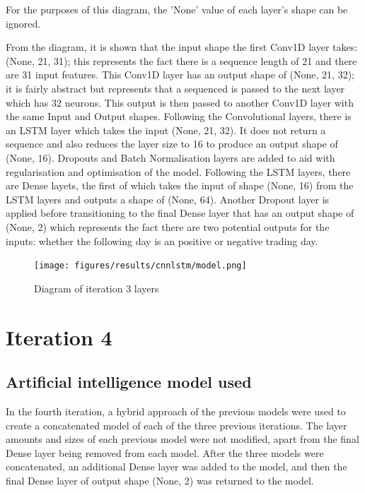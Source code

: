 For the purposes of this diagram, the 'None' value of each layer's shape can be ignored.

From the diagram, it is shown that the input shape the first Conv1D layer takes: (None, 21, 31); this represents the
fact there is a sequence length of 21 and there are 31 input features.  This Conv1D layer has an output shape of (None, 21, 32); it is fairly abstract
but represents that a sequenced is passed to the next layer which has 32 neurons. This output is then passed to another
Conv1D layer with the same Input and Output shapes. Following the Convolutional layers, there is an LSTM layer
which takes the input (None, 21, 32). It does not return a sequence and also reduces the layer size to 16 to produce an
output shape of (None, 16). Dropouts and Batch Normalisation layers are added to aid with regularisation and optimisation of the model.
Following the LSTM layers, there are Dense layets, the first of which takes the input of shape (None, 16) from the
LSTM layers and outputs a shape of (None, 64). Another Dropout layer is applied before transitioning to the final Dense layer that has an output shape of (None, 2)
which represents the fact there are two potential outputs for the inputs: whether the following day
is an positive or negative trading day.

\begin{figure}[ht]
    \centering
    \texttt{[image: figures/results/cnnlstm/model.png]}
    \caption[Diagram of iteration 3 layers]{Diagram of iteration 3 layers}
    \label{fig:iteration3_model}
\end{figure}
\FloatBarrier

\section{Iteration 4}
\subsection{Artificial intelligence model used}\label{ssec:iteration4_ai_model}
In the fourth iteration, a hybrid approach of the previous models were used to create a concatenated model of each
of the three previous iterations. The layer amounts and sizes of each previous model were not modified, apart from
the final Dense layer being removed from each model. After the three models were concatenated, an additional Dense
layer was added to the model, and then the final Dense layer of output shape (None, 2) was returned to the model.

